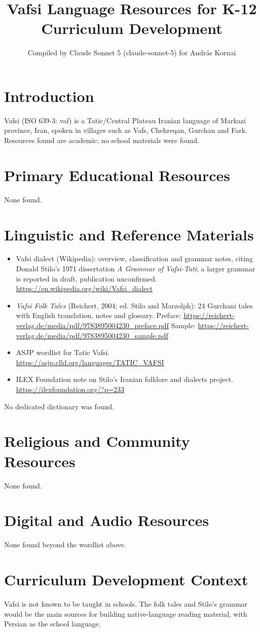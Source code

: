 \documentclass[12pt]{article}
\title{Vafsi Language Resources for K-12 Curriculum Development}
\author{Compiled by Claude Sonnet 5 (claude-sonnet-5) for Andr\'as Kornai}
\date{}
\begin{document}
\maketitle
\section{Introduction}
Vafsi (ISO 639-3: vaf) is a Tatic/Central Plateau Iranian language of Markazi province, Iran, spoken in villages such as Vafs, Chehreqan, Gurchan and Fark. Resources found are academic; no school materials were found.
\section{Primary Educational Resources}
None found.
\section{Linguistic and Reference Materials}
\begin{itemize}
\item Vafsi dialect (Wikipedia): overview, classification and grammar notes, citing Donald Stilo's 1971 dissertation \emph{A Grammar of Vafsi-Tati}; a larger grammar is reported in draft, publication unconfirmed. \url{https://en.wikipedia.org/wiki/Vafsi_dialect}
\item \emph{Vafsi Folk Tales} (Reichert, 2004; ed. Stilo and Marzolph): 24 Gurchani tales with English translation, notes and glossary. Preface: \url{https://reichert-verlag.de/media/pdf/9783895004230_preface.pdf} Sample: \url{https://reichert-verlag.de/media/pdf/9783895004230_sample.pdf}
\item ASJP wordlist for Tatic Vafsi. \url{https://asjp.clld.org/languages/TATIC_VAFSI}
\item ILEX Foundation note on Stilo's Iranian folklore and dialects project. \url{https://ilexfoundation.org/?p=233}
\end{itemize}
No dedicated dictionary was found.
\section{Religious and Community Resources}
None found.
\section{Digital and Audio Resources}
None found beyond the wordlist above.
\section{Curriculum Development Context}
Vafsi is not known to be taught in schools. The folk tales and Stilo's grammar would be the main sources for building native-language reading material, with Persian as the school language.
\end{document}

